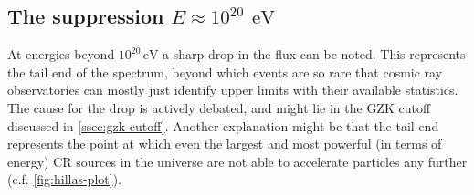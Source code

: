 \subsection{The suppression $E \approx 10^{20}\,\SI{}{\electronvolt}$}
\label{ssec:cr-cutoff}

At energies beyond $10^{20}\,\text{eV}$ a sharp drop in the flux can be noted. This represents the tail end of the spectrum, beyond which events are so rare that 
cosmic ray observatories can mostly just identify upper limits with their available statistics. The cause for the drop is actively debated, and might lie in the 
GZK cutoff discussed in \autoref{ssec:gzk-cutoff}. Another explanation might be that the tail end represents the point at which even the largest and most powerful
(in terms of energy) CR sources in the universe are not able to accelerate particles any further (c.f. \autoref{fig:hillas-plot}). 
